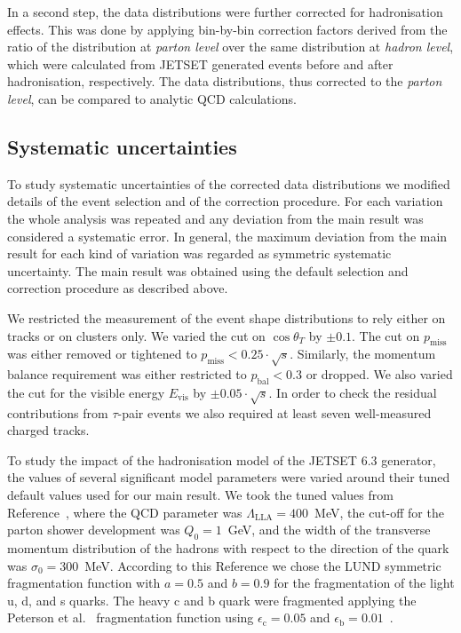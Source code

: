 \documentclass[12pt,a4paper,twoside]{article}
\begin{document}
In a second step, the data distributions were further corrected for
hadronisation effects. 
This was done by applying bin-by-bin correction factors derived from
the ratio of the distribution at {\em parton level} over the same
distribution at {\em hadron level}, which were 
calculated from JETSET generated
events before and after hadronisation, respectively. 
The data distributions, thus corrected to the {\em parton level}, 
can be compared to analytic QCD calculations.

\subsection{Systematic uncertainties}
\label{subsec-systematics}
To study systematic uncertainties of the corrected data distributions
we modified details of the event selection and of the correction procedure.
For each variation the whole analysis was repeated and 
any deviation from the main result was considered a systematic
error. 
In general, the maximum deviation from the main result for each 
kind of variation was regarded as symmetric systematic 
uncertainty.
The main result was obtained using the default selection and 
correction procedure as described above.

We restricted the measurement of the event shape 
distributions to rely either on tracks or on clusters only. We varied the cut
on $\cos\theta_T$ by $\pm 0.1$. The cut on $p_{\mathrm{miss}}$ was
either removed or tightened to $p_{\mathrm{miss}} < 0.25 \cdot \sqrt{s}$. 
Similarly, the momentum balance requirement was either restricted to 
$p_{\mathrm{bal}} < 0.3$ or dropped. We also varied the cut
for the visible energy $E_{\mathrm{vis}}$ by $\pm 0.05 \cdot \sqrt{s}$.
In order to check the residual contributions from $\tau$-pair events we
also required at least seven well-measured charged tracks.

To study the impact of the hadronisation model of the JETSET 6.3
generator, the values of several significant model parameters were
varied around their tuned default values used for 
our main result. We took the tuned values 
from Reference~\cite{bib-JADEtune},
where the QCD parameter was $\Lambda_{\mathrm{LLA}} = 400$~MeV, the cut-off 
for the parton shower development was $Q_0 = 1$~GeV, and the width of the 
transverse momentum distribution
of the hadrons with respect to the direction of the quark
was $\sigma_0 = 300$~MeV. According to this Reference we
chose the LUND symmetric fragmentation function with $a = 0.5$ and $b = 0.9$
for the fragmentation of the light u, d, and s quarks. The heavy c and b
quark were fragmented applying the Peterson et al.~\cite{bib-Peterson}
fragmentation function using $\epsilon_{\mathrm{c}}=0.05$ and 
$\epsilon_{\mathrm{b}}=0.01$~\cite{bib-JADEtune}.
\end{document}
